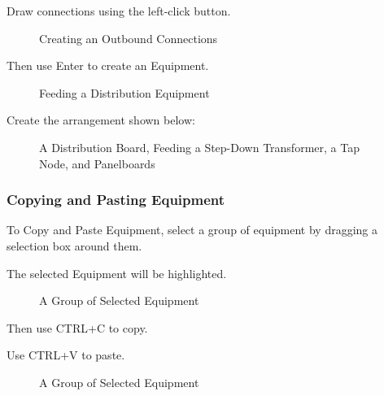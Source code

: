 \documentclass[letterpaper,10pt,english]{sphinxmanual}
\begin{document}
Draw connections using the left-click button.

\begin{figure}[H]
\centering
\capstart

\noindent{}
\caption{Creating an Outbound Connections}\label{\detokenize{docs/tutorial/index-tutorial:id11}}\end{figure}

Then use Enter to create an Equipment.

\begin{figure}[H]
\centering
\capstart

\noindent{}
\caption{Feeding a Distribution Equipment}\label{\detokenize{docs/tutorial/index-tutorial:id12}}\end{figure}

Create the arrangement shown below:

\begin{figure}[H]
\centering
\capstart

\noindent{}
\caption{A Distribution Board, Feeding a Step-Down Transformer, a Tap Node, and Panelboards}\label{\detokenize{docs/tutorial/index-tutorial:id13}}\end{figure}


\subsubsection{Copying and Pasting Equipment}
\label{\detokenize{docs/tutorial/index-tutorial:copying-and-pasting-equipment}}
To Copy and Paste Equipment, select a group of equipment by dragging a selection box around them.

The selected Equipment will be highlighted.

\begin{figure}[H]
\centering
\capstart

\noindent{}
\caption{A Group of Selected Equipment}\label{\detokenize{docs/tutorial/index-tutorial:id14}}\end{figure}

Then use CTRL+C to copy.

Use CTRL+V to paste.

\begin{figure}[H]
\centering
\capstart

\noindent{}
\caption{A Group of Selected Equipment}\label{\detokenize{docs/tutorial/index-tutorial:id15}}\end{figure}
\end{document}
